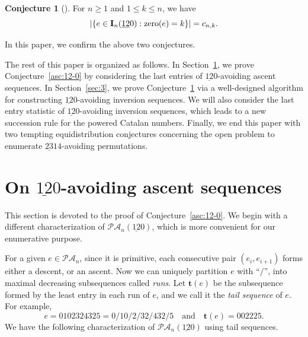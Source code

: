 \documentclass[12pt,A4]{amsart}
\numberwithin{equation}{section}
\theoremstyle{plain}
\theoremstyle{definition}
\newtheorem{conjecture}[theorem]{Conjecture}
\def\PA{\mathcal{PA}}
\def\zero{\mathrm{zero}}
\def\I{\operatorname{{\bf I}}}
\def\tt{\mathbf{t}}
\begin{document}
\begin{conjecture}[]\label{inv:12-0}
For $n\ge 1$ and $1\leq k\leq n$, we have
$$
|\{e\in\I_n(\underline{12}0):\zero(e)=k\}|=c_{n,k}.
$$
\end{conjecture}

In this paper, we confirm the above two conjectures. 

The rest of this paper is organized as follows. In Section~\ref{sec:2}, we prove Conjecture~\ref{asc:12-0} by considering the last entries of $\underline{12}0$-avoiding ascent sequences. In Section~\ref{sec:3}, we prove Conjecture~\ref{inv:12-0} via a well-designed algorithm for constructing  $\underline{12}0$-avoiding inversion sequences. We will also consider the last entry statistic of $\underline{12}0$-avoiding inversion sequences, which leads to a new succession rule for the powered Catalan numbers.  Finally, we end this paper with two tempting  equidistribution conjectures concerning the open problem to enumerate  $\underline{23}14$-avoiding permutations.


\section{On $\underline{12}0$-avoiding ascent sequences}
\label{sec:2}
This section is devoted to the proof of Conjecture~\ref{asc:12-0}. We begin with  a different characterization of $\PA_n(\underline{12}0)$, which is more convenient for our enumerative purpose.

For a given $e\in\PA_n$, since it is primitive, each consecutive pair $(e_i,e_{i+1})$ forms either a descent, or an ascent. Now we can uniquely partition $e$ with ``$\slash$'', into maximal decreasing subsequences called {\em runs}. Let $\tt(e)$ be the subsequence formed by the least entry in each run of $e$, and we call it the {\em tail sequence} of $e$. For example, $$e=0102324325=0\slash10\slash2\slash32\slash432\slash5\quad\text{and}\quad\tt(e)=002225.$$
We have the following characterization of $\PA_n(\underline{12}0)$ using tail sequences.
\end{document}

